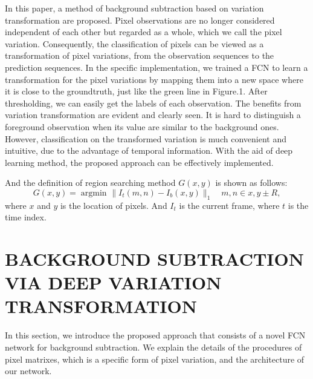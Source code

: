 \documentclass[journal]{IEEEtran}
\DeclareMathOperator*{\argmin}{argmin}
\begin{document}
In this paper, a method of background subtraction based on variation transformation are proposed. 
Pixel observations are no longer considered independent of each other but regarded as a whole, which we call the pixel variation. 
Consequently, the classification of pixels can be viewed as a transformation of pixel variations, from the observation sequences to the prediction sequences. 
In the specific implementation, we trained a FCN to learn a transformation for the pixel variations by mapping them into a new space where it is close to the groundtruth, just like the green line in Figure.1. 
After thresholding, we can easily get the labels of each observation. 
The benefits from variation transformation are evident and clearly seen. 
It is hard to distinguish a foreground observation when its value are similar to the background ones. 
However, classification on the transformed variation is much convenient and intuitive, due to the advantage of temporal information. 
With the aid of deep learning method, the proposed approach can be effectively implemented.

And the definition of region searching method $G(x,y)$ is shown as follows:
\begin{equation}
    G(x,y) =  \mathop{\argmin}_{}{ \lVert I_t(m,n) - I_b(x,y) \rVert_{1}  } \quad  m,n \in x,y \pm R,
\end{equation}
where $x$ and $y$ is the location of pixels. And $I_t$ is the current frame, where $t$ is the
time index.

\section{BACKGROUND SUBTRACTION VIA DEEP VARIATION TRANSFORMATION}
In this section, we introduce the proposed approach that consists of a novel FCN network for background subtraction. 
We explain the details of the procedures of pixel matrixes, which is a specific form of pixel variation, and the architecture of our network. 
\end{document}
